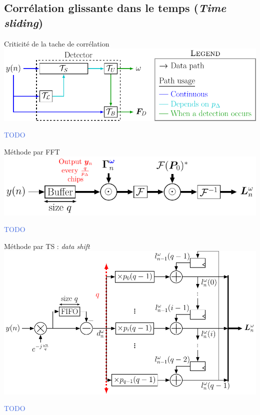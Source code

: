 \documentclass[../main.tex]{subfiles}
\begin{document}
\subsection{Corrélation glissante dans le temps (\emph{Time sliding})}

\begin{frame}{Criticité de la tache de corrélation}
  \includegraphics[width=\linewidth]{figures/tikzpicture/tasks_dep_stdl.pdf}
  \begin{center}
    \textcolor{RoyalBlue}{TODO}
  \end{center}
\end{frame}

\begin{frame}{Méthode par FFT}
  \centering
  \includegraphics[width=.6\linewidth, height=.7\textheight, keepaspectratio=true]{figures/tikzpicture/arch_fft_sync_stdl.pdf}
  \begin{center}
    \textcolor{RoyalBlue}{TODO}
  \end{center}
\end{frame}

\begin{frame}{Méthode par TS : \textit{data shift}}
  \centering
  \includegraphics[width=\linewidth, height=.7\textheight, keepaspectratio=true]{figures/tikzpicture/arch_statts_sync_stdl.pdf}
  \begin{center}
    \textcolor{RoyalBlue}{TODO}
  \end{center}
\end{frame}
\end{document}
